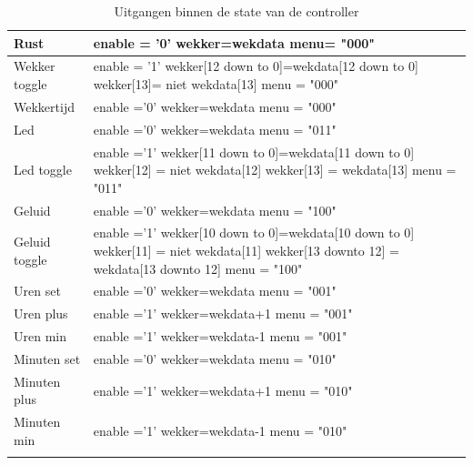 \begin{longtable}{|l| p{10cm} |}
\hline
Rust &
enable = '0' \newline
wekker=wekdata \newline
menu= "000" \\ \hline
Wekker toggle &
enable = '1' \newline
wekker[12 down to 0]=wekdata[12 down to 0] \newline
wekker[13]= niet wekdata[13] \newline
menu = "000" \\ \hline
Wekkertijd &
enable ='0' \newline
wekker=wekdata \newline
menu = "000" \\ \hline
Led &
enable ='0' \newline
wekker=wekdata \newline
menu = "011" \\ \hline
Led toggle &
enable ='1' \newline
wekker[11 down to 0]=wekdata[11 down to 0]\newline
wekker[12] = niet wekdata[12] \newline
wekker[13] = wekdata[13] \newline
menu = "011" \\ \hline
Geluid & 
enable ='0' \newline
wekker=wekdata \newline
menu = "100" \\ \hline
Geluid toggle &
enable ='1' \newline
wekker[10 down to 0]=wekdata[10 down to 0] \newline
wekker[11] = niet wekdata[11] \newline
wekker[13 downto 12] = wekdata[13 downto 12] \newline
menu = "100" \\ \hline
Uren set &
enable ='0' \newline
wekker=wekdata \newline
menu = "001" \\ \hline
Uren plus &
enable ='1' \newline
wekker=wekdata+1 \newline
menu = "001" \\ \hline
Uren min &
enable ='1' \newline
wekker=wekdata-1 \newline
menu = "001" \\ \hline
Minuten set&
enable ='0' \newline
wekker=wekdata \newline
menu = "010" \\ \hline
Minuten plus &
enable ='1' \newline
wekker=wekdata+1 \newline
menu = "010" \\ \hline
Minuten min &
enable ='1' \newline
wekker=wekdata-1 \newline
menu = "010" \\ \hline
\caption{Uitgangen binnen de state van de controller} 
\label{tab:states_controller}
\end{longtable}

